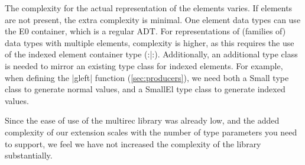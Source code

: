 The complexity for the actual representation of the elements varies.
If elements are not present, the extra complexity is minimal. One
element data types can use the E0 container, which is a regular ADT.
For representations of (families of) data types with multiple
elements, complexity is higher, as this requires the use of the
indexed element container type (:|:). Additionally, an additional type
class is needed to mirror an existing type class for indexed elements.
For example, when defining the |gleft| function (\ref{sec:producers}),
we need both a Small type class to generate normal values, and a
SmallEl type class to generate indexed values.

Since the ease of use of the multirec library was already low, and the
added complexity of our extension scales with the number of type
parameters you need to support, we feel we have not increased the
complexity of the library substantially.

